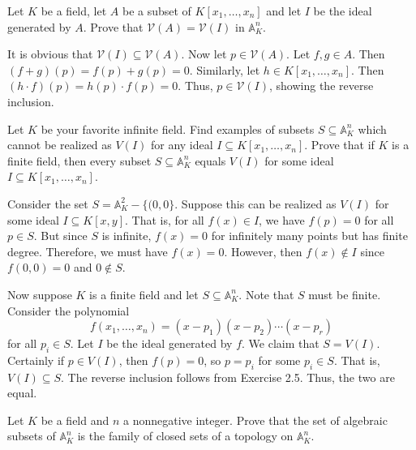 \documentclass[../../master.tex]{subfiles}
\begin{document}
\begin{problem}
    Let $K$ be a field, let $A$ be a subset of $K[x_1, \ldots, x_n]$ and let $I$ be the ideal generated by $A$.
    Prove that $\mathscr{V}(A) = \mathscr{V}(I)$ in $\mathbb{A}^{n}_K$.
\end{problem}

\begin{solution}
    It is obvious that $\mathscr{V}(I) \subseteq \mathscr{V}(A)$.
    Now let $p \in \mathscr{V}(A)$.
    Let $f, g \in A$.
    Then $(f + g)(p) = f(p) + g(p) = 0$.
    Similarly, let $h \in K[x_1, \ldots, x_n]$.
    Then $(h \cdot f)(p) = h(p) \cdot f(p) = 0$.
    Thus, $p \in \mathscr{V}(I)$, showing the reverse inclusion.
\end{solution}

\begin{problem}
    Let $K$ be your favorite infinite field.
    Find examples of subsets $S \subseteq \mathbb{A}^{n}_K$ which cannot be realized as $V(I)$ for any ideal $I \subseteq K[x_1, \ldots, x_n]$.
    Prove that if $K$ is a finite field, then every subset $S \subseteq \mathbb{A}^{n}_K$ equals $V(I)$ for some ideal $I \subseteq K[x_1, \ldots, x_n]$.
\end{problem}

\begin{solution}
    Consider the set $S = \mathbb{A}^2_K - \{(0, 0\}$.
    Suppose this can be realized as $V(I)$ for some ideal $I \subseteq K[x, y]$.
    That is, for all $f(x) \in I$, we have $f(p) = 0$ for all $p \in S$.
    But since $S$ is infinite, $f(x) = 0$ for infinitely many points but has finite degree.
    Therefore, we must have $f(x) = 0$.
    However, then $f(x) \notin I$ since $f(0, 0) = 0$ and $0 \notin S$.

    Now suppose $K$ is a finite field and let $S \subseteq \mathbb{A}^{n}_K$.
    Note that $S$ must be finite.
    Consider the polynomial
    \[
        f(x_1, \ldots, x_n) = (x - p_1) (x-p_2) \cdots (x-p_r)
    \]
    for all $p_i \in S$.
    Let $I$ be the ideal generated by $f$.
    We claim that $S = V(I)$.
    Certainly if $p \in V(I)$, then $f(p) = 0$, so $p = p_i$ for some $p_i \in S$.
    That is, $V(I) \subseteq S$.
    The reverse inclusion follows from Exercise 2.5.
    Thus, the two are equal.
\end{solution}

\begin{problem}
    Let $K$ be a field and $n$ a nonnegative integer.
    Prove that the set of algebraic subsets of $\mathbb{A}^{n}_K$ is the family of closed sets of a topology on $\mathbb{A}^{n}_K$.
\end{problem}
\end{document}
